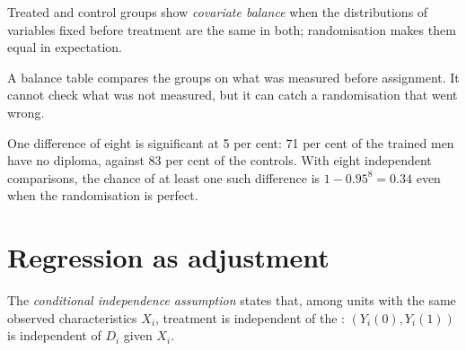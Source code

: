 \label{lst:b2:causality-and-experiments:nsw}

\label{out:b2:causality-and-experiments:nsw}

\begin{definition}\label{def:b2:causality-and-experiments:balance}
Treated and control groups show \emph{covariate balance} when the distributions of variables
fixed before treatment are the same in both; randomisation makes them equal in expectation.
\end{definition}

A balance table compares the groups on what was measured before assignment. It cannot check what was not measured, but it
can catch a randomisation that went wrong.

\label{lst:b2:causality-and-experiments:balance}

\label{out:b2:causality-and-experiments:balance}

One difference of eight is significant at 5 per cent: 71 per cent of the trained men have no diploma, against 83 per cent
of the controls. With eight independent comparisons, the chance of at least one such difference is $1 - 0.95^8 = 0.34$
even when the randomisation is perfect.

\section{Regression as adjustment}\label{sec:b2:causality-and-experiments:adjustment}

\begin{definition}\label{def:b2:causality-and-experiments:cia}
The \emph{conditional independence assumption} states that, among units with
the same observed characteristics $X_i$, treatment is independent of the : $(Y_i(0), Y_i(1))$ is
independent of $D_i$ given $X_i$.
\end{definition}

